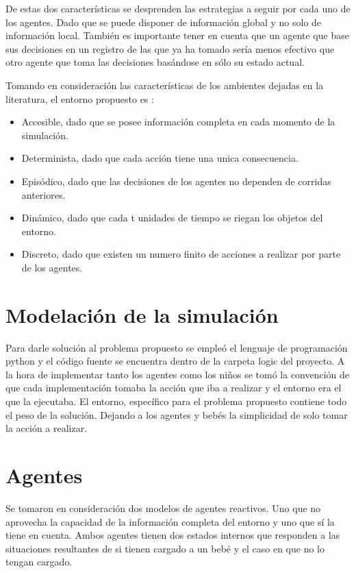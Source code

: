 \documentclass[a4paper,10pt,twocolumn]{article}
\begin{document}
	De estas dos características se desprenden las estrategias a seguir por cada uno de los agentes. Dado que se puede disponer de información global y no solo de información local. También es importante tener en cuenta que un agente que base sus decisiones en un registro de las que ya ha tomado sería menos efectivo que otro agente que toma las decisiones basándose en sólo su estado actual.
	
	Tomando en consideración las características de los ambientes dejadas en la literatura, el entorno propuesto es :
	
	\begin{itemize}
		\item Accesible, dado que se posee información completa en cada momento de la simulación.
		\item Determinista, dado que cada acción tiene una unica consecuencia.
		\item Episódico, dado que las decisiones de los agentes no dependen de corridas anteriores.
		\item Dinámico, dado que cada t unidades de tiempo se riegan los objetos del entorno.
		\item Discreto, dado que existen un numero finito de acciones a realizar por parte de los agentes.
	\end{itemize}
	
	
\section{Modelación de la simulación}

	Para darle solución al problema propuesto se empleó el lenguaje de programación python y el código fuente se encuentra dentro de la carpeta logic del proyecto. A la hora de implementar tanto los agentes como los niños se tomó la convención de que cada implementación tomaba la acción que iba a realizar y el entorno era el que la ejecutaba. El entorno, específico para el problema propuesto contiene todo el peso de la solución. Dejando a los agentes y bebés la simplicidad de solo tomar la acción a realizar.
	
\section{Agentes}
	
	Se tomaron en consideración dos modelos de agentes reactivos. Uno que no aprovecha la capacidad de la información completa del entorno y uno que sí la tiene en cuenta. Ambos agentes tienen dos estados internos que responden a las situaciones resultantes de si tienen cargado a un bebé y el caso en que no lo tengan cargado.
	
\end{document}
